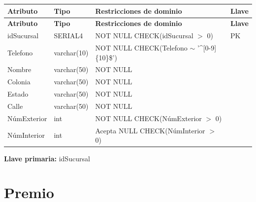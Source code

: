 \documentclass[12pt]{article}
\begin{document}
\begin{longtable}{p{3.5cm} p{2.5cm} p{7.5cm} p{1.5cm}}
\label{tab:sucursal}\\
\toprule
\textbf{Atributo} & \textbf{Tipo} & \textbf{Restricciones de dominio} & \textbf{Llave} \\
\midrule
\endfirsthead

\toprule
\textbf{Atributo} & \textbf{Tipo} & \textbf{Restricciones de dominio} & \textbf{Llave} \\
\midrule
\endhead

\bottomrule
\endfoot

idSucursal 
& SERIAL4 
& NOT NULL \newline CHECK(idSucursal $>$ 0)
& PK \\

Telefono 
& varchar(10) 
& NOT NULL \newline CHECK(Telefono $\sim$ '\^{}[0-9]\{10\}\$')
&  \\

Nombre 
& varchar(50) 
& NOT NULL
&  \\

Colonia 
& varchar(50) 
& NOT NULL
&  \\

Estado 
& varchar(50) 
& NOT NULL
&  \\

Calle 
& varchar(50) 
& NOT NULL
&  \\

NúmExterior 
& int 
& NOT NULL \newline CHECK(NúmExterior $>$ 0)
&  \\

NúmInterior 
& int 
& Acepta NULL \newline CHECK(NúmInterior $>$ 0)
&  \\

\end{longtable}

\vspace{2pt}
\textbf{Llave primaria:} idSucursal\\

\section*{Premio}
\end{document}
